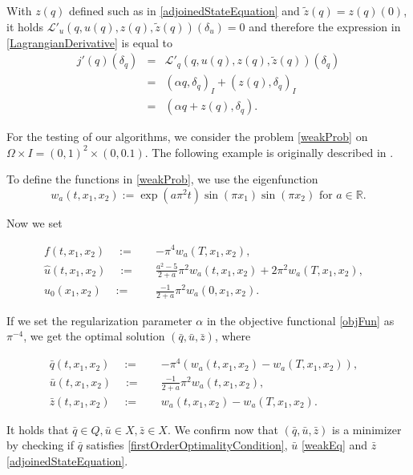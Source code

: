 With $z(q)$ defined such as in \eqref{adjoinedStateEquation} and $\tilde{z}(q)=z(q)(0)$, it holds $\mathcal{L}'_u(q,u(q),z(q),\tilde{z}(q))(\delta_u)=0$ and therefore the expression in \eqref{LagrangianDerivative} is equal to
\begin{eqnarray*}
j'(q)(\delta_q)&=&\mathcal{L}'_q(q, u(q), z(q), \tilde{z}(q))(\delta_q)\\
&=&(\alpha q,\delta_q)_I+(z(q),\delta_q)_I\\
&=&(\alpha q+z(q),\delta_q).
\end{eqnarray*}


For the testing of our algorithms, we consider the problem \eqref{weakProb} on $\Omega\times I=(0,1)^2\times(0,0.1)$. The following example is originally described in \cite{doi:10.1137/070694016}.

To define the functions in \eqref{weakProb}, we use the eigenfunction
\begin{displaymath}
w_a(t,x_1,x_2):=\exp(a\pi^2t)\sin(\pi x_1)\sin(\pi x_2) \text{ for } a\in\mathbb{R}.
\end{displaymath}

Now we set

\begin{equation*}
\begin{aligned}
f(t,x_1,x_2)\quad:=\quad&-\pi^4w_a(T,x_1,x_2),&\\
\hat{u}(t,x_1,x_2)\quad:=\quad&\frac{a^2-5}{2+a}\pi^2w_a(t,x_1,x_2)+2\pi^2w_a(T,x_1,x_2),&\\
u_0(x_1,x_2)\quad:=\quad&\frac{-1}{2+a}\pi^2w_a(0,x_1,x_2).&
\end{aligned}
\end{equation*}

If we set the regularization parameter $\alpha$ in the objective functional \eqref{objFun} as $\pi^{-4}$, we get the optimal solution $(\bar{q}, \bar{u}, \bar{z})$, where

\begin{equation}
\label{analyticalSolution}
\begin{aligned}
\bar{q}(t,x_1,x_2)\quad:=\quad&-\pi^4\left(w_a(t,x_1,x_2)-w_a(T,x_1,x_2)\right),&\\
\bar{u}(t,x_1,x_2)\quad:=\quad&\frac{-1}{2+a}\pi^2w_a(t,x_1,x_2),&\\
\bar{z}(t,x_1,x_2)\quad:=\quad&w_a(t,x_1,x_2)-w_a(T,x_1,x_2).&
\end{aligned}
\end{equation}

It holds that $\bar{q}\in Q, \bar{u}\in X, \bar{z}\in X$. We confirm now that $(\bar{q}, \bar{u}, \bar{z})$ is a minimizer by checking if $\bar{q}$ satisfies \eqref{firstOrderOptimalityCondition}, $\bar{u}$ \eqref{weakEq} and $\bar{z}$ \eqref{adjoinedStateEquation}.

